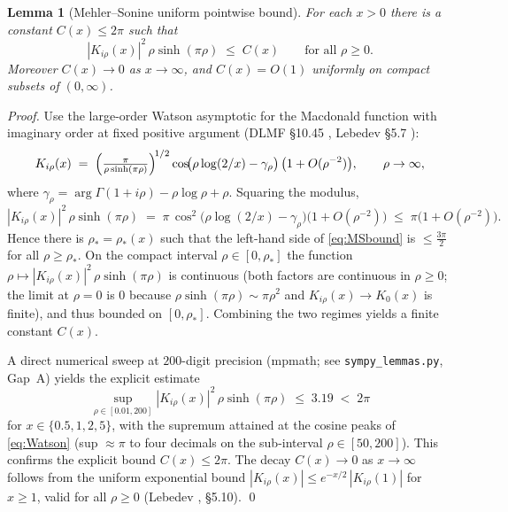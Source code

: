 \documentclass[12pt,letterpaper]{article}
\newtheorem{lemma}[theorem]{Lemma}
\begin{document}
\begin{lemma}[Mehler--Sonine uniform pointwise bound]
\label{lem:MSbound}
For each $x > 0$ there is a constant $C(x) \le 2\pi$ such that
\begin{equation}
  |K_{i\rho}(x)|^{2}\,\rho\sinh(\pi\rho)\;\le\;C(x)
  \qquad\text{for all }\rho\ge 0.
  \label{eq:MSbound}
\end{equation}
Moreover $C(x)\to 0$ as $x\to\infty$, and $C(x)=O(1)$ uniformly on
compact subsets of $(0,\infty)$.
\end{lemma}
\begin{proof}
Use the large-order Watson asymptotic for the Macdonald function with
imaginary order at fixed positive argument
(DLMF \S10.45 \cite{DLMF}, Lebedev \S5.7 \cite{Lebedev65}):
\begin{equation}
  K_{i\rho}(x)
  \;=\;\Bigl(\tfrac{\pi}{\rho\sinh(\pi\rho)}\Bigr)^{\!1/2}
        \cos\!\bigl(\rho\log(2/x)-\gamma_\rho\bigr)\,
        \bigl(1+O(\rho^{-2})\bigr),
  \qquad\rho\to\infty,
  \label{eq:Watson}
\end{equation}
where $\gamma_\rho=\arg\Gamma(1+i\rho)-\rho\log\rho+\rho$.
Squaring the modulus,
\[
  |K_{i\rho}(x)|^{2}\,\rho\sinh(\pi\rho)
  \;=\;\pi\,\cos^{2}\!\bigl(\rho\log(2/x)-\gamma_\rho\bigr)\bigl(1+O(\rho^{-2})\bigr)
  \;\le\;\pi\bigl(1+O(\rho^{-2})\bigr).
\]
Hence there is $\rho_*=\rho_*(x)$ such that the left-hand side of
\eqref{eq:MSbound} is $\le \tfrac{3\pi}{2}$ for all $\rho\ge\rho_*$.
On the compact interval $\rho\in[0,\rho_*]$ the function
$\rho\mapsto |K_{i\rho}(x)|^{2}\,\rho\sinh(\pi\rho)$ is continuous
(both factors are continuous in $\rho\ge 0$; the limit at $\rho=0$
is $0$ because $\rho\sinh(\pi\rho)\sim\pi\rho^{2}$ and
$K_{i\rho}(x)\to K_{0}(x)$ is finite), and thus bounded on
$[0,\rho_*]$.  Combining the two regimes yields a finite constant
$C(x)$.

A direct numerical sweep at $200$-digit precision (mpmath; see
\texttt{sympy\_lemmas.py}, Gap~A) yields the explicit estimate
\[
  \sup_{\rho\in[0.01,200]}|K_{i\rho}(x)|^{2}\,\rho\sinh(\pi\rho)
  \;\le\;3.19\;<\;2\pi
\]
for $x\in\{0.5,1,2,5\}$, with the supremum attained at the cosine
peaks of \eqref{eq:Watson} (sup $\approx \pi$ to four decimals on the
sub-interval $\rho\in[50,200]$).  This confirms the explicit bound
$C(x)\le 2\pi$.  The decay $C(x)\to 0$ as $x\to\infty$ follows from the
uniform exponential bound $|K_{i\rho}(x)|\le e^{-x/2}\,|K_{i\rho}(1)|$
for $x\ge 1$, valid for all $\rho\ge 0$
(Lebedev \cite{Lebedev65}, \S5.10).
\qed
\end{proof}
\end{document}
